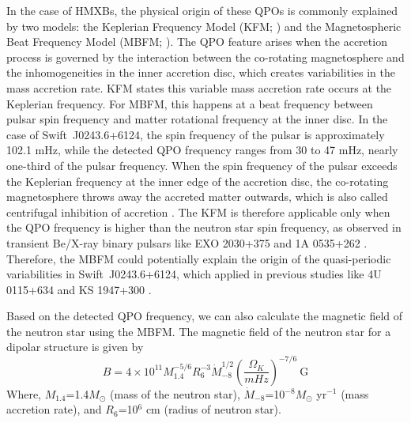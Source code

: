 \documentclass[twocolumn,trackchanges]{aastex631}
\begin{document}
In the case of HMXBs, the physical origin of these QPOs is commonly explained by two models: the Keplerian Frequency Model (KFM; \citealt{1987ApJ...316..411V}) and the Magnetospheric Beat Frequency Model (MBFM; \citealt{1985Natur.316..239A}).  The QPO feature arises when the accretion process is governed by the interaction between the co-rotating magnetosphere and the inhomogeneities in the inner accretion disc, which creates variabilities in the mass accretion rate. KFM states this variable mass accretion rate occurs at the Keplerian frequency. For MBFM, this happens at a beat frequency between pulsar spin frequency and matter rotational frequency at the inner disc. In the case of Swift~J0243.6+6124, the spin frequency of the pulsar is approximately 102.1 mHz, while the detected QPO frequency ranges from 30 to 47 mHz, nearly one-third of the pulsar frequency. When the spin frequency of the pulsar exceeds the Keplerian frequency at the inner edge of the accretion disc, the co-rotating magnetosphere throws away the accreted matter outwards, which is also called centrifugal inhibition of accretion \citep{1973ApJ...184..271L}. The KFM is therefore applicable only when the QPO frequency is higher than the neutron star spin frequency, as observed in transient Be/X-ray binary pulsars like EXO 2030+375 \citep{1989ApJ...346..906A} and 1A 0535+262 \citep{1996ApJ...459..288F}.   Therefore, the MBFM could potentially explain the origin of the quasi-periodic variabilities in Swift~J0243.6+6124, which applied in previous studies like 4U 0115+634 \citep{2013MNRAS.434.2458D} and KS 1947+300 \citep{2010MNRAS.407..285J}. 
 

Based on the detected QPO frequency, we can also calculate the magnetic field of the neutron star using the MBFM. The magnetic field of the neutron star for a dipolar structure is given by  \begin{equation}\label{eq:q}
  B =  4 \times 10^{11}  M_{1.4}^{-5/6}R_{6}^{-3}\dot{M}_{-8}^{1/2}(\frac{\Omega_{K}}{mHz})^{-7/6} ~\text{G}
  \end{equation}
Where, $M_{1.4}$=1.4$M_{\odot}$ (mass of the neutron star), $\dot{M}_{-8}$=10$^{-8}M_{\odot}$ yr$^{-1}$ (mass accretion rate), and $R_{6}$=10$^{6}$ cm (radius of neutron star).
\end{document}
